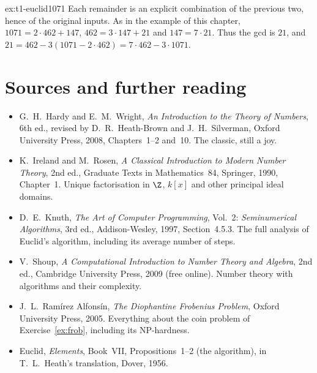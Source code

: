 \begin{solution}{ex:t1-euclid1071}
\idea Each remainder is an explicit combination of the previous two, hence of the original inputs.
\writeup As in the example of this chapter, $1071=2\cdot 462+147$, $462=3\cdot 147+21$ and $147=7\cdot 21$. Thus the gcd is $21$, and $21=462-3(1071-2\cdot 462)=7\cdot 462-3\cdot 1071$.
\end{solution}

\section*{Sources and further reading}

\begin{itemize}
\item G.~H.~Hardy and E.~M.~Wright, \emph{An Introduction to the Theory of Numbers}, 6th ed., revised by D.~R.~Heath-Brown and J.~H.~Silverman, Oxford University Press, 2008, Chapters~1--2 and~10. The classic, still a joy.
\item K.~Ireland and M.~Rosen, \emph{A Classical Introduction to Modern Number Theory}, 2nd ed., Graduate Texts in Mathematics~84, Springer, 1990, Chapter~1. Unique factorisation in $\Z$, $k[x]$ and other principal ideal domains.
\item D.~E.~Knuth, \emph{The Art of Computer Programming}, Vol.~2: \emph{Seminumerical Algorithms}, 3rd ed., Addison-Wesley, 1997, Section~4.5.3. The full analysis of Euclid's algorithm, including its average number of steps.
\item V.~Shoup, \emph{A Computational Introduction to Number Theory and Algebra}, 2nd ed., Cambridge University Press, 2009 (free online). Number theory with algorithms and their complexity.
\item J.~L.~Ram\'irez Alfons\'in, \emph{The Diophantine Frobenius Problem}, Oxford University Press, 2005. Everything about the coin problem of Exercise~\ref{ex:frob}, including its NP-hardness.
\item Euclid, \emph{Elements}, Book~VII, Propositions~1--2 (the algorithm), in T.~L.~Heath's translation, Dover, 1956.
\end{itemize}
